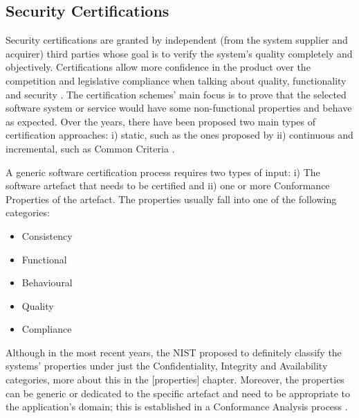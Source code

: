 \subsection{Security Certifications}
Security certifications are granted by independent (from the system supplier and acquirer) third parties whose goal is to verify the system's quality completely and objectively. Certifications allow more confidence in the product over the competition and legislative compliance when talking about quality, functionality and security \cite{heck2010software}. The certification schemes' main focus is to prove that the selected software system or service would have some non-functional properties and behave as expected. 
Over the years, there have been proposed two main types of certification approaches: i) static, such as the ones proposed by \cite{anisetti2013test}\cite{CSATrustSTAR} ii) continuous and incremental, such as Common Criteria \cite{anisetti2017semi}\cite{infrastructure2002common}. 

A generic software certification process requires two types of input: i) The software artefact that needs to be certified and ii) one or more Conformance Properties of the artefact. The properties usually fall into one of the following categories:

\begin{itemize}
    \item Consistency
    \item Functional
    \item Behavioural
    \item Quality
    \item Compliance 
\end{itemize}

Although in the most recent years, the NIST proposed to definitely classify the systems' properties under just the Confidentiality, Integrity and Availability categories, more about this in the [properties] chapter. Moreover, the properties can be generic or dedicated to the specific artefact and need to be appropriate to the application's domain; this is established in a Conformance Analysis process \cite{anisetti2017semi}.


